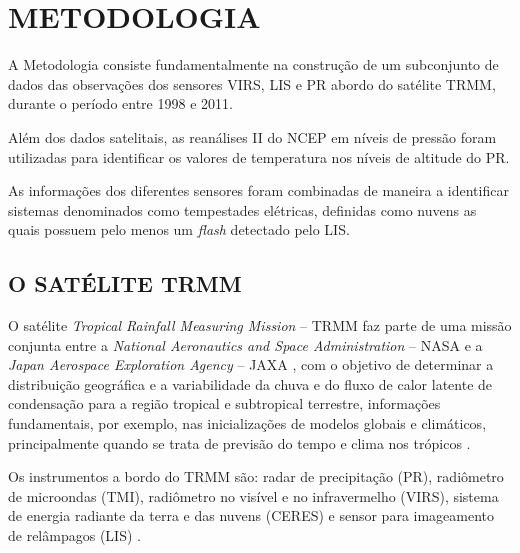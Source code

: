 \chapter{METODOLOGIA}
\label{metodologia}

A Metodologia consiste fundamentalmente na construção de um subconjunto de dados das observações dos sensores VIRS, LIS e PR abordo do satélite TRMM, durante o período entre 1998 e 2011. 

Além dos dados satelitais, as reanálises II do NCEP  em níveis de pressão foram utilizadas para identificar os valores de temperatura nos níveis de altitude do PR.

As informações dos diferentes sensores foram combinadas de maneira a identificar sistemas denominados como tempestades elétricas, definidas como nuvens as quais possuem pelo menos um \textit{flash} detectado pelo LIS. 


\section{O SATÉLITE TRMM}
\label{metodologiaTRMM}

O satélite \textit{Tropical Rainfall Measuring Mission} -- TRMM  faz parte de uma missão conjunta entre a \textit{National Aeronautics and Space Administration} -- NASA e  a \textit{Japan Aerospace Exploration Agency} -- JAXA , com o objetivo de determinar a distribuição geográfica e a variabilidade da chuva e do fluxo de calor latente de condensação para a região tropical e subtropical terrestre, informações fundamentais, por exemplo, nas inicializações de modelos globais e climáticos, principalmente quando se trata de previsão do tempo e clima nos trópicos \cite{kummerok1998,simpson1988}.
  
Os instrumentos a bordo do TRMM são: radar de precipitação (PR), radiômetro de microondas (TMI), radiômetro no visível e no infravermelho (VIRS), sistema de energia radiante da terra e das nuvens (CERES) e sensor para imageamento de relâmpagos (LIS) \cite{kummerok1998}.


